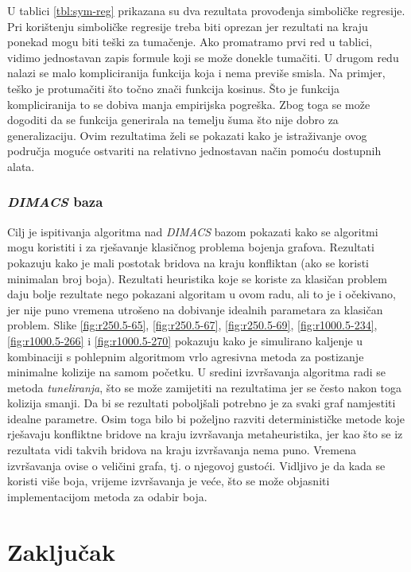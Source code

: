 \documentclass[times, utf8, diplomski, numeric]{fer}
\begin{document}
U tablici \ref{tbl:sym-reg} prikazana su dva rezultata provođenja simboličke regresije. Pri korištenju simboličke regresije treba biti oprezan jer rezultati na kraju ponekad mogu biti teški za tumačenje. Ako promatramo prvi red u tablici, vidimo jednostavan zapis formule koji se može donekle tumačiti. U drugom redu nalazi se malo kompliciranija funkcija koja i nema previše smisla. Na primjer, teško je protumačiti što točno znači funkcija kosinus. Što je funkcija kompliciranija to se dobiva manja empirijska pogreška. Zbog toga se može dogoditi da se funkcija generirala na temelju šuma što nije dobro za generalizaciju. Ovim rezultatima želi se pokazati kako je istraživanje ovog područja moguće ostvariti na relativno jednostavan način pomoću dostupnih alata.


\subsection{\emph{DIMACS} baza}

Cilj je ispitivanja algoritma nad \emph{DIMACS} bazom pokazati kako se algoritmi mogu koristiti i za rješavanje klasičnog problema bojenja grafova. Rezultati pokazuju kako je mali postotak bridova na kraju konfliktan (ako se koristi minimalan broj boja). Rezultati heuristika koje se koriste za klasičan problem daju bolje rezultate nego pokazani algoritam u ovom radu, ali to je i očekivano, jer nije puno vremena utrošeno na dobivanje idealnih parametara za klasičan problem. Slike \ref{fig:r250.5-65}, \ref{fig:r250.5-67}, \ref{fig:r250.5-69}, \ref{fig:r1000.5-234}, \ref{fig:r1000.5-266} i \ref{fig:r1000.5-270} pokazuju kako je simulirano kaljenje u kombinaciji s pohlepnim algoritmom vrlo agresivna metoda za postizanje minimalne kolizije na samom početku. U sredini izvršavanja algoritma radi se metoda \emph{tuneliranja}, što se može zamijetiti na rezultatima jer se često nakon toga kolizija smanji. Da bi se rezultati poboljšali potrebno je za svaki graf namjestiti idealne parametre. Osim toga bilo bi poželjno razviti determinističke metode koje rješavaju konfliktne bridove na kraju izvršavanja metaheuristika, jer kao što se iz rezultata vidi takvih bridova na kraju izvršavanja nema puno. Vremena izvršavanja ovise o veličini grafa, tj. o njegovoj gustoći. Vidljivo je da kada se koristi više boja, vrijeme izvršavanja je veće, što se može objasniti implementacijom metoda za odabir boja.

\chapter{Zaključak}
\end{document}
